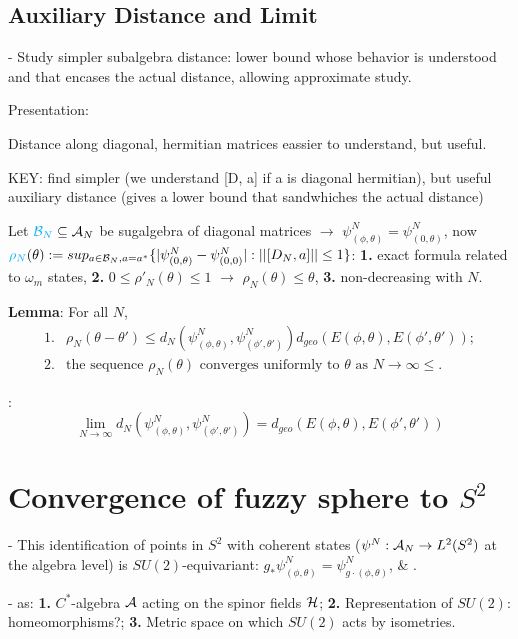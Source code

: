\subsection{Auxiliary Distance and Limit}
 - Study simpler subalgebra distance: lower bound whose behavior is understood and that encases the actual distance, allowing approximate study.

Presentation:

Distance along diagonal, hermitian matrices eassier to understand, but useful.

 KEY: find simpler (we understand [D, a] if a is diagonal hermitian), but useful auxiliary distance (gives a lower bound that sandwhiches the actual distance)
 
Let $\textcolor{cyan}{\mathcal B_N} \subseteq \mathcal A_N$ be sugalgebra of diagonal matrices $\xrightarrow{}$ $\psi^N_{(\phi, \theta)} = \psi^N_{(0, \theta)}$, now 
$\textcolor{cyan}{\rho_N}(\theta) := sup_{a \in \mathcal B_N, a = a^*}\{|\psi^N_{(0, \theta)} - \psi^N_{(0, 0)}| : ||[D_N, a]|| \leq 1\}$: \textbf{1.} exact formula related to $\omega_m$ states, \textbf{2.} $0 \leq \rho'_N(\theta) \leq 1$ $\xrightarrow{}$ $\rho_N(\theta) \leq \theta$, \textbf{3.} non-decreasing with $N$.


\textbf{Lemma}: For all $N$, 
\begin{align*}
    1.& \rho_N(\theta - \theta') \leq d_N(\psi^N_{(\phi, \theta)}, \psi^N_{(\phi', \theta')}) d_{geo}(E(\phi, \theta), E(\phi', \theta'))  ; \\
    2.& \text{the sequence $\rho_N(\theta)$ converges uniformly to $\theta$ as $N\to \infty$} \leq .
\end{align*}

\textbf{}:  
\begin{equation}
        \lim_{N \to \infty} d_N(\psi^N_{(\phi, \theta)}, \psi^N_{(\phi', \theta')}) = d_{geo}(E(\phi, \theta), E(\phi', \theta'))
\end{equation}

\section{Convergence of fuzzy sphere to $S^2$}\label{FSsec:convergence}

 - This identification of points in $S^2$ with coherent states ($\psi^N: \mathcal A_N \to L^2(S^2)$ at the algebra level) 
is $SU(2)$-equivariant: $g_* \psi^N_{(\phi, \theta)} = \psi^N_{g\cdot (\phi, \theta)}$, \& .
 
 - as: \textbf{1.} $C^*$-algebra $\mathcal A$ acting on the spinor fields $\mathcal H$; \textbf{2.} Representation of $SU(2)$: homeomorphisms?; \textbf{3.}  Metric space on which $SU(2)$ acts by isometries.
